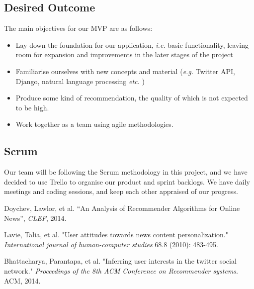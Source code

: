 \documentclass[11pt]{article}
\newcommand{\ie}{\emph{i.e.} }
\newcommand{\etc}{\emph{etc.} }
\newcommand{\eg}{\emph{e.g.} }
\begin{document}
\subsection{Desired Outcome}

The main objectives for our MVP are as follows:

 \begin{itemize}
 	\item Lay down the foundation for our application, \ie basic functionality, leaving room for expansion and improvements in the later stages of the project
	
	\item Familiarise ourselves with new concepts and material (\eg Twitter API, Django, natural language processing \etc)
    
    \item Produce some kind of recommendation, the quality of which is not expected to be high.
    
    \item Work together as a team using agile methodologies.
    
 \end{itemize}

\subsection{Scrum}

Our team will be following the Scrum methodology in this project, and we have decided to use Trello to organise our product and sprint backlogs. We have daily meetings and coding sessions, and keep each other appraised of our progress.



\begin{thebibliography}{20}
 Doychev, Lawlor, et al. ``An Analysis of Recommender Algorithms for Online News'', \emph{CLEF}, 2014.

 Lavie, Talia, et al. "User attitudes towards news content personalization." \emph{International journal of human-computer studies} 68.8 (2010): 483-495.


 Bhattacharya, Parantapa, et al. "Inferring user interests in the twitter social network." \emph{Proceedings of the 8th ACM Conference on Recommender systems}. ACM, 2014.
\end{thebibliography}
\end{document}

